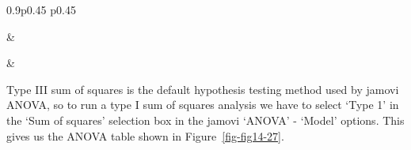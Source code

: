 \documentclass[
  a4paper,
]{book}
\begin{document}
\begin{table}[ht]
\caption{\label{tbl-tab14-18}And more possible null and alternative hypotheses with the outcome
variable ``babble'' }\tabularnewline

\begin{centerbox}
\begin{threeparttable}
\setlength{\tabcolsep}{0pt}
\begin{tabularx}{0.9\textwidth}{p{} p{}}



 &
 \tabularnewline[-0.5pt]



 &
 \tabularnewline[-0.5pt]


\end{tabularx} 

\end{threeparttable}\par\end{centerbox}

\end{table}
 

Type III sum of squares is the default hypothesis testing method used by
jamovi ANOVA, so to run a type I sum of squares analysis we have to
select `Type 1' in the `Sum of squares' selection box in the jamovi
`ANOVA' - `Model' options. This gives us the ANOVA table shown in
Figure~\ref{fig-fig14-27}.
\end{document}
